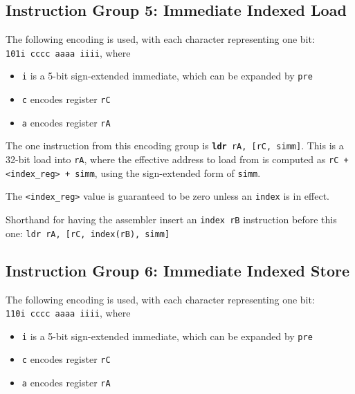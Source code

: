 \documentclass{article}
\begin{document}
	\doublespacing
	\subsection{Instruction Group 5:  Immediate Indexed Load}
	The following encoding is used, with each character representing one
	bit:  \\
	\texttt{101i cccc aaaa iiii}, where

	\singlespacing
	\begin{itemize}
		\item \texttt{i} is a 5-bit sign-extended immediate, which can
		be expanded by \texttt{pre}  
		\item \texttt{c} encodes register \texttt{rC}
		\item \texttt{a} encodes register \texttt{rA}
	\end{itemize}
	\doublespacing

	The one instruction from this encoding group is
	\texttt{\textbf{ldr} rA, [rC, simm]}.
	This is a 32-bit load into \texttt{rA}, where the effective address to
	load from is computed as \texttt{rC + <index\_reg> + simm}, using the
	sign-extended form of \texttt{simm}.

	The \texttt{<index\_reg>} value is guaranteed to be zero unless an
	\texttt{index} is in effect.

	Shorthand for having the assembler insert an \texttt{index rB}
	instruction before this one: \texttt{ldr rA, [rC, index(rB), simm]}


	\subsection{Instruction Group 6:  Immediate Indexed Store}
	The following encoding is used, with each character representing one
	bit:  \\
	\texttt{110i cccc aaaa iiii}, where

	\singlespacing
	\begin{itemize}
		\item \texttt{i} is a 5-bit sign-extended immediate, which can
		be expanded by \texttt{pre}  
		\item \texttt{c} encodes register \texttt{rC}
		\item \texttt{a} encodes register \texttt{rA}
	\end{itemize}
	\doublespacing
\end{document}
